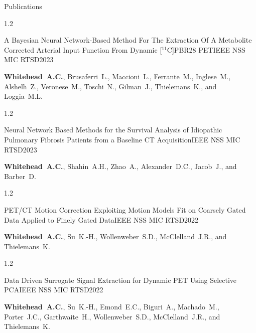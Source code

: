 \documentclass{cv}
\begin{document}
\begin{rSection}{Publications}
        \vspace{-0.5cm}
        \begin{spacing}{1.2}
            \item \begin{rSubsection}{A Bayesian Neural Network-Based Method For The Extraction Of A Metabolite Corrected Arterial Input Function From Dynamic [$^{11}$C]PBR28 PET}{}{IEEE NSS MIC RTSD}{2023}
                \vspace{-0.25cm}
                \item \textbf{Whitehead~A.C.}, Brusaferri~L., Maccioni~L., Ferrante~M., Inglese~M., Alshelh~Z., Veronese~M., Toschi~N., Gilman~J., Thielemans~K., and Loggia~M.L.
            \end{rSubsection}
        \end{spacing}

        \vspace{-0.5cm}
        \begin{spacing}{1.2}
            \item \begin{rSubsection}{Neural Network Based Methods for the Survival Analysis of Idiopathic Pulmonary Fibrosis Patients from a Baseline CT Acquisition}{}{IEEE NSS MIC RTSD}{2023}
                \vspace{-0.25cm}
                \item \textbf{Whitehead~A.C.}, Shahin~A.H., Zhao~A., Alexander~D.C., Jacob~J., and Barber~D.
            \end{rSubsection}
        \end{spacing}

        \vspace{-0.5cm}
        \begin{spacing}{1.2}
            \item \begin{rSubsection}{PET/CT Motion Correction Exploiting Motion Models Fit on Coarsely Gated Data Applied to Finely Gated Data}{}{IEEE NSS MIC RTSD}{2022}
                \vspace{-0.25cm}
                \item \textbf{Whitehead~A.C.}, Su~K.-H., Wollenweber~S.D., McClelland~J.R., and Thielemans~K.
            \end{rSubsection}
        \end{spacing}

        \vspace{-0.5cm}
        \begin{spacing}{1.2}
            \item \begin{rSubsection}{Data Driven Surrogate Signal Extraction for Dynamic PET Using Selective PCA}{}{IEEE NSS MIC RTSD}{2022}
                \vspace{-0.25cm}
                \item \textbf{Whitehead~A.C.}, Su~K.-H., Emond~E.C., Biguri~A., Machado~M., Porter~J.C., Garthwaite~H., Wollenweber~S.D., McClelland~J.R., and Thielemans~K.
            \end{rSubsection}
        \end{spacing}


\end{rSection}
\end{document}
